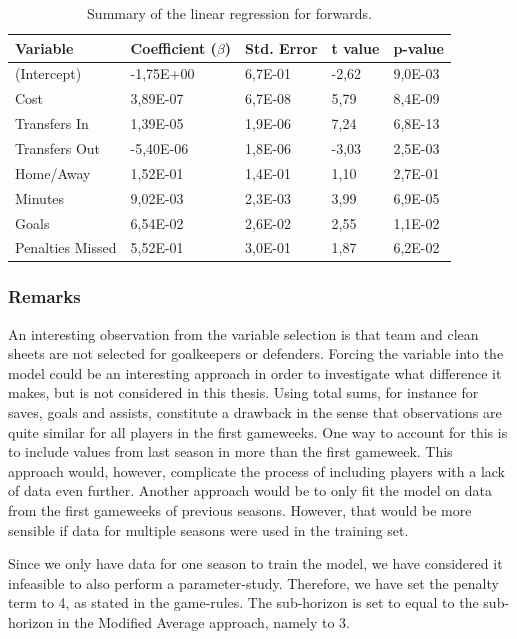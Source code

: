 \begin{table}[H]
\centering
\begin{tabular}{|l|l|l|l|l|}
\hline
Variable         & Coefficient ($\beta$)  & Std. Error & t value & p-value \\ \hline
(Intercept)      & -1,75E+00 & 6,7E-01    & -2,62   & 9,0E-03 \\
Cost             & 3,89E-07  & 6,7E-08    & 5,79    & 8,4E-09 \\
Transfers In     & 1,39E-05  & 1,9E-06    & 7,24    & 6,8E-13 \\
Transfers Out    & -5,40E-06 & 1,8E-06    & -3,03   & 2,5E-03 \\
Home/Away        & 1,52E-01  & 1,4E-01    & 1,10    & 2,7E-01 \\
Minutes          & 9,02E-03  & 2,3E-03    & 3,99    & 6,9E-05 \\
Goals            & 6,54E-02  & 2,6E-02    & 2,55    & 1,1E-02 \\
Penalties Missed & 5,52E-01  & 3,0E-01    & 1,87    & 6,2E-02 \\
\hline
\end{tabular}
\caption{Summary of the linear regression for forwards.}
\label{tab:coef_FWD}
\end{table}

\subsubsection{Remarks}

An interesting observation from the variable selection is that team and clean sheets are not selected for goalkeepers or defenders. Forcing the variable into the model could be an interesting approach in order to investigate what difference it makes, but is not considered in this thesis. Using total sums, for instance for saves, goals and assists, constitute a drawback in the sense that observations are quite similar for all players in the first gameweeks. One way to account for this is to include values from last season in more than the first gameweek. This approach would, however, complicate the process of including players with a lack of data even further. Another approach would be to only fit the model on data from the first gameweeks of previous seasons. However, that would be more sensible if data for multiple seasons were used in the training set.

\newpar

Since we only have data for one season to train the model, we have considered it infeasible to also perform a parameter-study. Therefore, we have set the penalty term to 4, as stated in the game-rules. The sub-horizon is set to equal to the sub-horizon in the Modified Average approach, namely to 3.

